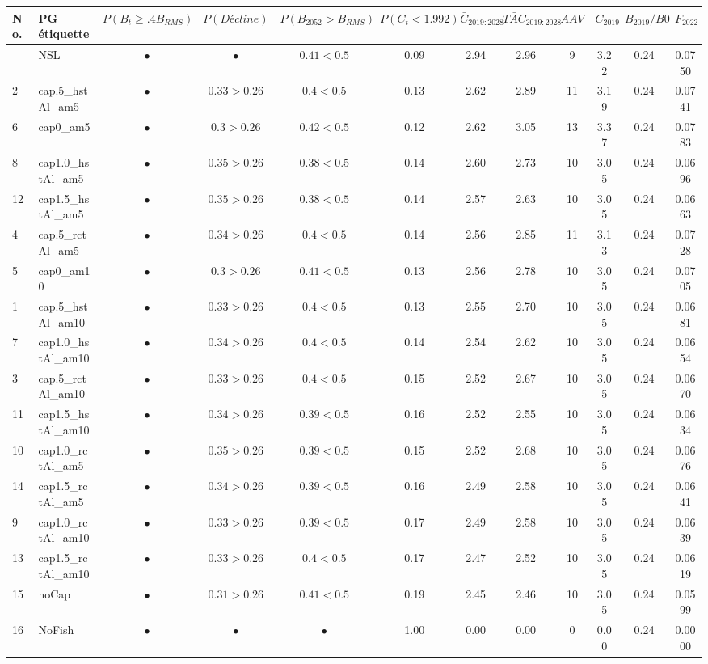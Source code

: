 \documentclass[11pt]{book}
\begin{document}
\begin{landscape}
\begin{longtable}[t]{llcccccccccc}
\toprule
\textbf{No.} & \textbf{PG étiquette} & \textbf{$P(B_t \geq .4B_{RMS})$} & \textbf{$P(Décline)$} & \textbf{$P(B_{2052} > B_{RMS})$} & \textbf{$P(C_t < 1.992)$} & \textbf{$\bar{C}_{2019:2028}$} & \textbf{$\bar{TAC}_{2019:2028}$} & \textbf{$AAV$} & \textbf{$C_{2019}$} & \textbf{$B_{2019}/B0$} & \textbf{$F_{2022}$}\\
\midrule
\endhead
\
\endfoot
\bottomrule
\endlastfoot
17 & NSL & $\bullet$ & $\bullet$ & $0.41<0.5$ & 0.09 & 2.94 & 2.96 & 9 & 3.22 & 0.24 & 0.0750\\
2 & cap.5\_hstAl\_am5 & $\bullet$ & $0.33>0.26$ & $0.4<0.5$ & 0.13 & 2.62 & 2.89 & 11 & 3.19 & 0.24 & 0.0741\\
6 & cap0\_am5 & $\bullet$ & $0.3>0.26$ & $0.42<0.5$ & 0.12 & 2.62 & 3.05 & 13 & 3.37 & 0.24 & 0.0783\\
8 & cap1.0\_hstAl\_am5 & $\bullet$ & $0.35>0.26$ & $0.38<0.5$ & 0.14 & 2.60 & 2.73 & 10 & 3.05 & 0.24 & 0.0696\\
12 & cap1.5\_hstAl\_am5 & $\bullet$ & $0.35>0.26$ & $0.38<0.5$ & 0.14 & 2.57 & 2.63 & 10 & 3.05 & 0.24 & 0.0663\\
4 & cap.5\_rctAl\_am5 & $\bullet$ & $0.34>0.26$ & $0.4<0.5$ & 0.14 & 2.56 & 2.85 & 11 & 3.13 & 0.24 & 0.0728\\
5 & cap0\_am10 & $\bullet$ & $0.3>0.26$ & $0.41<0.5$ & 0.13 & 2.56 & 2.78 & 10 & 3.05 & 0.24 & 0.0705\\
1 & cap.5\_hstAl\_am10 & $\bullet$ & $0.33>0.26$ & $0.4<0.5$ & 0.13 & 2.55 & 2.70 & 10 & 3.05 & 0.24 & 0.0681\\
7 & cap1.0\_hstAl\_am10 & $\bullet$ & $0.34>0.26$ & $0.4<0.5$ & 0.14 & 2.54 & 2.62 & 10 & 3.05 & 0.24 & 0.0654\\
3 & cap.5\_rctAl\_am10 & $\bullet$ & $0.33>0.26$ & $0.4<0.5$ & 0.15 & 2.52 & 2.67 & 10 & 3.05 & 0.24 & 0.0670\\
11 & cap1.5\_hstAl\_am10 & $\bullet$ & $0.34>0.26$ & $0.39<0.5$ & 0.16 & 2.52 & 2.55 & 10 & 3.05 & 0.24 & 0.0634\\
10 & cap1.0\_rctAl\_am5 & $\bullet$ & $0.35>0.26$ & $0.39<0.5$ & 0.15 & 2.52 & 2.68 & 10 & 3.05 & 0.24 & 0.0676\\
14 & cap1.5\_rctAl\_am5 & $\bullet$ & $0.34>0.26$ & $0.39<0.5$ & 0.16 & 2.49 & 2.58 & 10 & 3.05 & 0.24 & 0.0641\\
9 & cap1.0\_rctAl\_am10 & $\bullet$ & $0.33>0.26$ & $0.39<0.5$ & 0.17 & 2.49 & 2.58 & 10 & 3.05 & 0.24 & 0.0639\\
13 & cap1.5\_rctAl\_am10 & $\bullet$ & $0.33>0.26$ & $0.4<0.5$ & 0.17 & 2.47 & 2.52 & 10 & 3.05 & 0.24 & 0.0619\\
15 & noCap & $\bullet$ & $0.31>0.26$ & $0.41<0.5$ & 0.19 & 2.45 & 2.46 & 10 & 3.05 & 0.24 & 0.0599\\
16 & NoFish & $\bullet$ & $\bullet$ & $\bullet$ & 1.00 & 0.00 & 0.00 & 0 & 0.00 & 0.24 & 0.0000\\*
\end{longtable}
\endgroup{}
\end{landscape}
\endgroup{}
\end{document}
